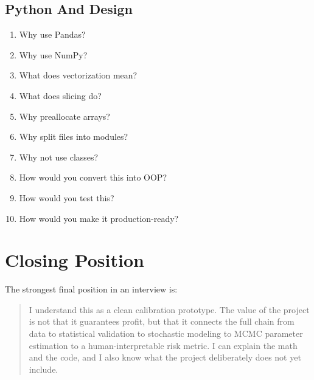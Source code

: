 \documentclass[11pt]{article}
\begin{document}
\subsection{Python And Design}

\begin{enumerate}
  \item Why use Pandas?
  \item Why use NumPy?
  \item What does vectorization mean?
  \item What does slicing do?
  \item Why preallocate arrays?
  \item Why split files into modules?
  \item Why not use classes?
  \item How would you convert this into OOP?
  \item How would you test this?
  \item How would you make it production-ready?
\end{enumerate}

\section{Closing Position}

The strongest final position in an interview is:

\begin{quote}
I understand this as a clean calibration prototype. The value of the project is
not that it guarantees profit, but that it connects the full chain from data to
statistical validation to stochastic modeling to MCMC parameter estimation to a
human-interpretable risk metric. I can explain the math and the code, and I also
know what the project deliberately does not yet include.
\end{quote}
\end{document}
